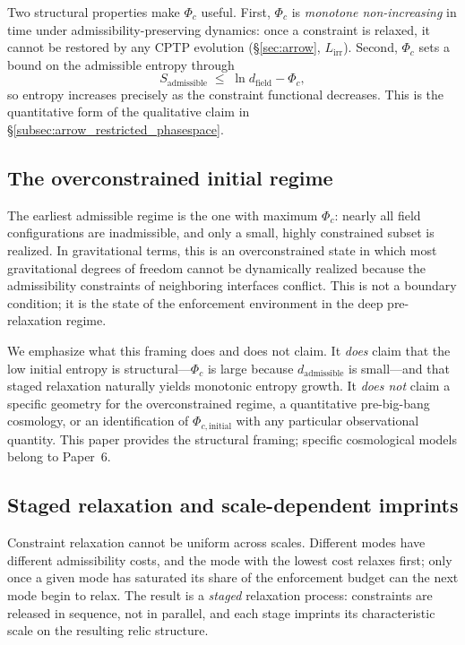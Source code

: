 \documentclass[11pt]{article}
\begin{document}
Two structural properties make $\Phi_c$ useful.  First, $\Phi_c$ is
\emph{monotone non-increasing} in time under admissibility-preserving
dynamics: once a constraint is relaxed, it cannot be restored by any CPTP
evolution (\S\ref{sec:arrow}, $L_{\mathrm{irr}}$).  Second, $\Phi_c$ sets a
bound on the admissible entropy through
\[
  S_{\mathrm{admissible}} \;\leq\; \ln d_{\mathrm{field}} - \Phi_c,
\]
so entropy increases precisely as the constraint functional decreases.
This is the quantitative form of the qualitative claim in
\S\ref{subsec:arrow_restricted_phasespace}.

\subsection{The overconstrained initial regime}
\label{subsec:cos_overconstrained}

The earliest admissible regime is the one with maximum $\Phi_c$: nearly
all field configurations are inadmissible, and only a small, highly
constrained subset is realized.  In gravitational terms, this is an
overconstrained state in which most gravitational degrees of freedom
cannot be dynamically realized because the admissibility constraints of
neighboring interfaces conflict.  This is not a boundary condition; it is
the state of the enforcement environment in the deep pre-relaxation
regime.

We emphasize what this framing does and does not claim.  It \emph{does}
claim that the low initial entropy is structural---$\Phi_c$ is large
because $d_{\mathrm{admissible}}$ is small---and that staged relaxation
naturally yields monotonic entropy growth.  It \emph{does not} claim a
specific geometry for the overconstrained regime, a quantitative
pre-big-bang cosmology, or an identification of $\Phi_{c,\mathrm{initial}}$
with any particular observational quantity.  This paper provides the
structural framing; specific cosmological models belong to Paper~6.

\subsection{Staged relaxation and scale-dependent imprints}
\label{subsec:cos_staged}

Constraint relaxation cannot be uniform across scales.  Different modes
have different admissibility costs, and the mode with the lowest cost
relaxes first; only once a given mode has saturated its share of the
enforcement budget can the next mode begin to relax.  The result is a
\emph{staged} relaxation process: constraints are released in sequence,
not in parallel, and each stage imprints its characteristic scale on the
resulting relic structure.
\end{document}
